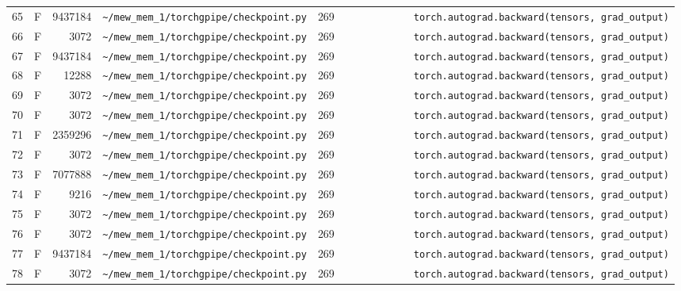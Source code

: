 \documentclass{article}
\begin{document}
\begin{longtable}{r l r p{6.5cm} r p{7.0cm}}
65 & F & 9437184 & \lstinline|~/mew_mem_1/torchgpipe/checkpoint.py| & 269 & \lstinline|            torch.autograd.backward(tensors, grad_output)| \\
66 & F & 3072 & \lstinline|~/mew_mem_1/torchgpipe/checkpoint.py| & 269 & \lstinline|            torch.autograd.backward(tensors, grad_output)| \\
67 & F & 9437184 & \lstinline|~/mew_mem_1/torchgpipe/checkpoint.py| & 269 & \lstinline|            torch.autograd.backward(tensors, grad_output)| \\
68 & F & 12288 & \lstinline|~/mew_mem_1/torchgpipe/checkpoint.py| & 269 & \lstinline|            torch.autograd.backward(tensors, grad_output)| \\
69 & F & 3072 & \lstinline|~/mew_mem_1/torchgpipe/checkpoint.py| & 269 & \lstinline|            torch.autograd.backward(tensors, grad_output)| \\
70 & F & 3072 & \lstinline|~/mew_mem_1/torchgpipe/checkpoint.py| & 269 & \lstinline|            torch.autograd.backward(tensors, grad_output)| \\
71 & F & 2359296 & \lstinline|~/mew_mem_1/torchgpipe/checkpoint.py| & 269 & \lstinline|            torch.autograd.backward(tensors, grad_output)| \\
72 & F & 3072 & \lstinline|~/mew_mem_1/torchgpipe/checkpoint.py| & 269 & \lstinline|            torch.autograd.backward(tensors, grad_output)| \\
73 & F & 7077888 & \lstinline|~/mew_mem_1/torchgpipe/checkpoint.py| & 269 & \lstinline|            torch.autograd.backward(tensors, grad_output)| \\
74 & F & 9216 & \lstinline|~/mew_mem_1/torchgpipe/checkpoint.py| & 269 & \lstinline|            torch.autograd.backward(tensors, grad_output)| \\
75 & F & 3072 & \lstinline|~/mew_mem_1/torchgpipe/checkpoint.py| & 269 & \lstinline|            torch.autograd.backward(tensors, grad_output)| \\
76 & F & 3072 & \lstinline|~/mew_mem_1/torchgpipe/checkpoint.py| & 269 & \lstinline|            torch.autograd.backward(tensors, grad_output)| \\
77 & F & 9437184 & \lstinline|~/mew_mem_1/torchgpipe/checkpoint.py| & 269 & \lstinline|            torch.autograd.backward(tensors, grad_output)| \\
78 & F & 3072 & \lstinline|~/mew_mem_1/torchgpipe/checkpoint.py| & 269 & \lstinline|            torch.autograd.backward(tensors, grad_output)| \\

\end{longtable}
\end{document}
